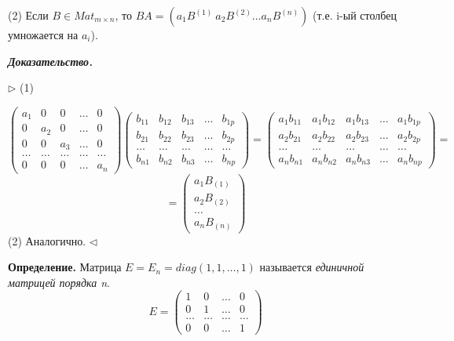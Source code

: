 \vspace{\baselineskip}
(2) Если $B \in Mat_{m \times n}$, то $BA = (a_1 B^{(1)} \ a_2 B^{(2)} \dots a_n B^{(n)})$ (т.е. i-ый столбец умножается на $a_i$).

\textbf{\textit{Доказательство.}}

$\rhd$ (1)

\begin{equation*}\begin{pmatrix} a_1 & 0 & 0 & \dots & 0 \\
0 & a_2 & 0 & \dots & 0 \\
0 & 0 & a_3 & \dots & 0 \\
\dots & \dots & \dots & \dots & \dots \\
0 & 0 & 0 & \dots & a_n 
\end{pmatrix} \begin{pmatrix} b_{11} & b_{12} & b_{13} & \dots & b_{1p} \\
b_{21} & b_{22} & b_{23} & \dots & b_{2p} \\
\dots & \dots & \dots & \dots & \dots \\
b_{n1} & b_{n2} & b_{n3} & \dots & b_{np}
\end{pmatrix} = \begin{pmatrix} a_1 b_{11} & a_1 b_{12} & a_1 b_{13} & \dots & a_1 b_{1p} \\
a_2 b_{21} & a_2 b_{22} & a_2 b_{23} & \dots & a_2 b_{2p} \\
\dots & \dots & \dots & \dots & \dots \\
a_n b_{n1} & a_n b_{n2} & a_n b_{n3} & \dots & a_n b_{np}
\end{pmatrix} = \end{equation*}
\begin{equation*} = \begin{pmatrix} a_1 B_{(1)} \\ a_2 B_{(2)} \\ \dots \\ a_n B_{(n)} \end{pmatrix} \end{equation*}
(2) Аналогично. $\lhd$

\vspace{\baselineskip}
\textbf{Определение.} Матрица $E = E_n = diag(1, 1, \dots, 1)$ называется \textit{единичной матрицей порядка n}.
\begin{equation*} E = \begin{pmatrix} 1 & 0 & \dots & 0 \\ 
0 & 1 & \dots & 0 \\
\dots & \dots & \dots & \dots \\
0 & 0 & \dots & 1 
\end{pmatrix} \end{equation*}

